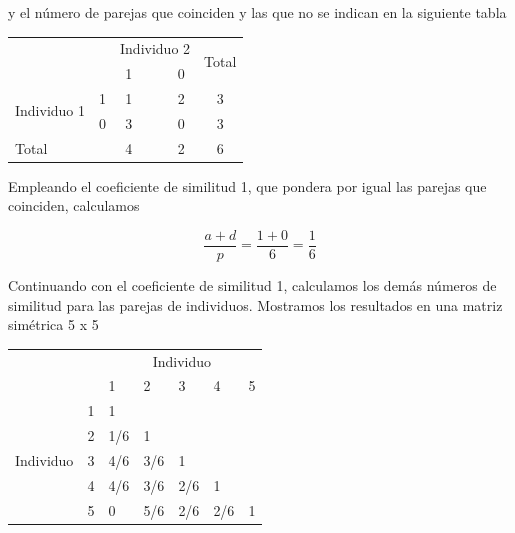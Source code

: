 \documentclass[a4paper, 20pt]{article}
\begin{document}
y el número de parejas que coinciden y las que no se indican en la siguiente tabla

\begin{table}[]
\begin{tabular}{ll|clc|c|l}
\multicolumn{2}{l|}{\multirow{2}{*}{}} & \multicolumn{3}{c}{Individuo 2} & \multicolumn{2}{c|}{\multirow{2}{*}{Total}} \\
\multicolumn{2}{l|}{}                  & 1        &       & 0       & \multicolumn{2}{c|}{}                        \\ \hline
\multirow{2}{*}{Individuo 1}       & 1      & 1        &       & 2       & \multicolumn{2}{c|}{3}                     \\
                              & 0      & 3        &       & 0       & \multicolumn{2}{c|}{3}                     \\ \hline
\multicolumn{2}{l|}{Total}            & 4      &       & 2     & \multicolumn{2}{c|}{6}              
\end{tabular}
\end{table}

Empleando el coeficiente de similitud 1, que pondera por igual las parejas que coinciden, calculamos

$$\frac{a+d}{p}=\frac{1+0}{6}=\frac{1}{6} $$

Continuando con el coeficiente de similitud 1, calculamos los demás números de similitud para las parejas de individuos. Mostramos los resultados en una matriz simétrica 5 x 5


\begin{table}[]
\begin{tabular}{lllllll}
\multicolumn{2}{l}{\multirow{2}{*}{}}               & \multicolumn{5}{c}{Individuo}                  \\
\multicolumn{2}{l}{}                                & 1   & 2   & 3   & 4   & 5                      \\ \cline{3-3} \cline{7-7} 
\multirow{5}{*}{Individuo} & \multicolumn{1}{l|}{1} & 1   &     &     &     & \multicolumn{1}{l|}{}  \\
                           & \multicolumn{1}{l|}{2} & 1/6 & 1   &     &     & \multicolumn{1}{l|}{}  \\
                           & \multicolumn{1}{l|}{3} & 4/6 & 3/6 & 1   &     & \multicolumn{1}{l|}{}  \\
                           & \multicolumn{1}{l|}{4} & 4/6 & 3/6 & 2/6 & 1   & \multicolumn{1}{l|}{}  \\
                           & \multicolumn{1}{l|}{5} & 0   & 5/6 & 2/6 & 2/6 & \multicolumn{1}{l|}{1} \\ \cline{3-3} \cline{7-7} 
\end{tabular}
\end{table}
\end{document}
